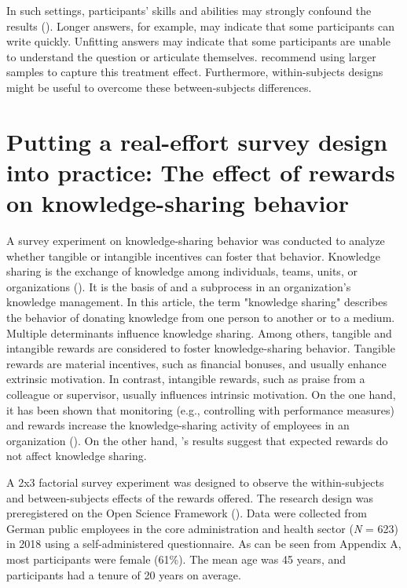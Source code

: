 \documentclass[twocolumn, issue, empirical, authordate]{jote-new-article}
\begin{document}
In such settings, participants' skills and abilities may strongly confound the results (). Longer answers, for example, may indicate that some participants can write quickly.
Unfitting answers may indicate that some participants are unable to understand the question or articulate themselves. \textcite{Charness2018} recommend using larger samples to capture this treatment effect.
Furthermore, within-subjects designs might be useful to overcome these between-subjects differences.



\section{Putting a real-effort survey design into practice: The effect of rewards on knowledge-sharing behavior}

A survey experiment on knowledge-sharing behavior was conducted to analyze whether tangible or intangible incentives can foster that behavior. Knowledge sharing is the exchange of knowledge among individuals, teams, units, or organizations ().
It is the basis of and a subprocess in an organization's knowledge management. In this article, the term "knowledge sharing" describes the behavior of donating knowledge from one person to another or to a medium. Multiple determinants influence knowledge sharing. Among others, tangible and intangible rewards are considered to foster knowledge-sharing behavior. Tangible rewards are material incentives, such as financial bonuses, and usually enhance extrinsic motivation. In contrast, intangible rewards, such as praise from a colleague or supervisor, usually influences intrinsic motivation. On the one hand, it has been shown that monitoring (e.g., controlling with performance measures) and rewards increase the knowledge-sharing activity of employees in an organization (). On the other hand, \textcite{Bock2002}'s results suggest that expected rewards do not affect knowledge sharing.

A 2x3 factorial survey experiment was designed to observe the within-subjects and between-subjects effects of the rewards offered. The research design was preregistered on the Open Science Framework (). Data were collected from German public employees in the core administration and health sector (\emph{N} = 623) in 2018 using a self-administered questionnaire. As can be seen from Appendix A, most participants were female (61\%). The mean age was 45 years, and participants had a tenure of 20 years on average.
\end{document}
